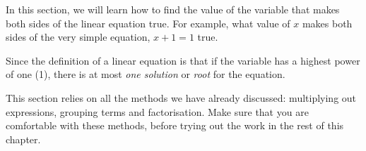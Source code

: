       \label{m39241*id145267}In this section, we will learn how to find the value of the variable that makes
both sides of the linear equation true. For example, what value of $x$ makes
both sides of the very simple equation, $x+1=1$ true.\par 
      \label{m39241*id145297}Since the definition of a linear equation is that if the variable has a highest power of one (1), there is
at most \textsl{one solution} or \textsl{root} for the equation.\par 
      \label{m39241*id145312}This section relies on all the methods we have already discussed: multiplying
out expressions, grouping terms and factorisation. Make sure that you are
comfortable with these methods, before trying out the work in the rest of this
chapter.\par 
      \label{m39241*id145317}\nopagebreak\noindent{}
